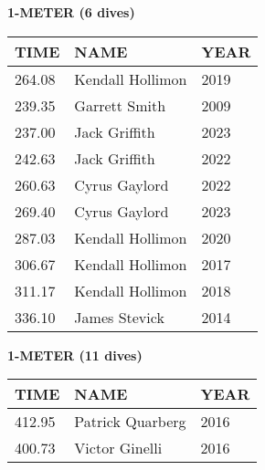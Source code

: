 \begin{center}
\begin{minipage}[t]{0.7\textwidth}
\centering
\textbf{1-METER (6 dives)}\\[0.05cm]
\begin{tabular}{@{}p{1.8cm}p{2.8cm}p{1.2cm}@{}}
\hline
\textbf{TIME} & \textbf{NAME} & \textbf{YEAR} \\
\hline
264.08 & Kendall Hollimon & 2019 \\
239.35 & Garrett Smith & 2009 \\
237.00 & Jack Griffith & 2023 \\
242.63 & Jack Griffith & 2022 \\
260.63 & Cyrus Gaylord & 2022 \\
269.40 & Cyrus Gaylord & 2023 \\
287.03 & Kendall Hollimon & 2020 \\
306.67 & Kendall Hollimon & 2017 \\
311.17 & Kendall Hollimon & 2018 \\
336.10 & James Stevick & 2014 \\
\hline
\end{tabular}
\end{minipage}
\end{center}

\vspace{0.4cm}

\begin{center}
\begin{minipage}[t]{0.7\textwidth}
\centering
\textbf{1-METER (11 dives)}\\[0.05cm]
\begin{tabular}{@{}p{1.8cm}p{2.8cm}p{1.2cm}@{}}
\hline
\textbf{TIME} & \textbf{NAME} & \textbf{YEAR} \\
\hline
412.95 & Patrick Quarberg & 2016 \\
400.73 & Victor Ginelli & 2016 \\
\hline
\end{tabular}
\end{minipage}
\end{center}

\vspace{0.4cm}

